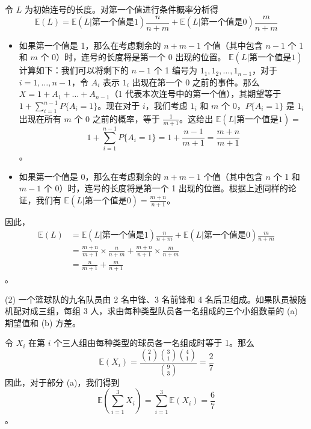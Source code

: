 \begin{questions}
\begin{solution}
令 $L$ 为初始连号的长度。对第一个值进行条件概率分析得
\[
\mathbb{E}(L) = \mathbb{E}(L | 第一个值是 1) \frac{n}{n+m} + \mathbb{E}(L | 第一个值是 0) \frac{m}{n+m}
\]
\begin{itemize}
    \item 如果第一个值是 1，那么在考虑剩余的 $n+m-1$ 个值（其中包含 $n-1$ 个 1 和 $m$ 个 0）时，连号的长度将是第一个 0 出现的位置。
    $\mathbb{E}(L | 第一个值是 1)$ 计算如下：我们可以将剩下的 $n-1$ 个 1 编号为 $1_1, 1_2, \dots, 1_{n-1}$，对于 $i = 1, \dots, n-1$，令 $A_i$ 表示 $1_i$ 出现在第一个 0 之前的事件。那么 $X = 1 + A_1 + \dots + A_{n-1}$（1 代表本次连号中的第一个值），其期望等于 $1 + \sum_{i=1}^{n-1} P\{A_i = 1\}$。现在对于 $i$，我们考虑 $1_i$ 和 $m$ 个 0，$P\{A_i = 1\}$ 是 $1_i$ 出现在所有 $m$ 个 0 之前的概率，等于 $\frac{1}{m+1}$。这给出 $\mathbb{E}(L | 第一个值是 1) =$
    \[
    1 + \sum_{i=1}^{n-1} P\{A_i = 1\} = 1 + \frac{n-1}{m+1} = \frac{m+n}{m+1}
    \]。
    \item 如果第一个值是 0，那么在考虑剩余的 $n+m-1$ 个值（其中包含 $n$ 个 1 和 $m-1$ 个 0）时，连号的长度将是第一个 1 出现的位置。根据上述同样的论证，我们有 $\mathbb{E}(L | 第一个值是 0) = \frac{m+n}{n+1}$。
\end{itemize}
因此，
\begin{align*}
\mathbb{E}(L) &= \mathbb{E}(L | 第一个值是 1) \frac{n}{n+m} + \mathbb{E}(L | 第一个值是 0) \frac{m}{n+m} \\
&= \frac{m+n}{m+1} \times \frac{n}{n+m} + \frac{m+n}{n+1} \times \frac{m}{n+m} \\
&= \frac{n}{m+1} + \frac{m}{n+1}
\end{align*}。
\end{solution}

\question (2) 一个篮球队的九名队员由 2 名中锋、3 名前锋和 4 名后卫组成。如果队员被随机配对成三组，每组 3 人，求由每种类型队员各一名组成的三个小组数量的 (a) 期望值和 (b) 方差。

\begin{solution}
令 $X_i$ 在第 $i$ 个三人组由每种类型的球员各一名组成时等于 1。那么
\[
\mathbb{E}(X_i) = \frac{\binom{2}{1} \binom{3}{1} \binom{4}{1}}{\binom{9}{3}} = \frac{2}{7}
\]
因此，对于部分 (a)，我们得到
\[
\mathbb{E}\left(\sum_{i=1}^3 X_i\right) = \sum_{i=1}^3 \mathbb{E}(X_i) = \frac{6}{7}
\]。


\end{solution}
\end{questions}
